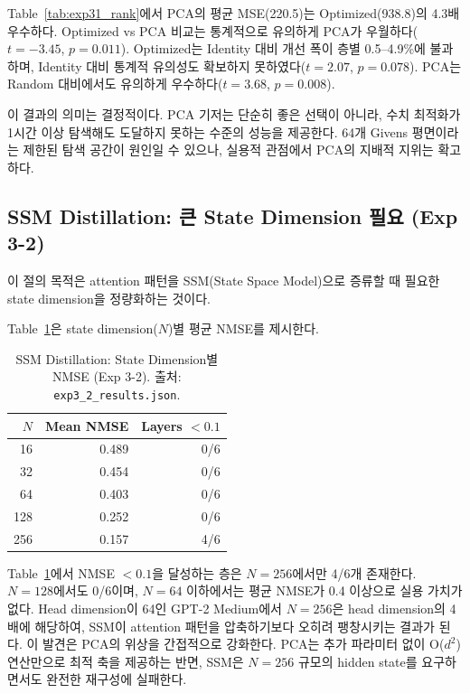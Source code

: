 \documentclass[11pt,a4paper]{article}
\begin{document}
Table~\ref{tab:exp31_rank}에서 PCA의 평균 MSE(220.5)는 Optimized(938.8)의 4.3배 우수하다.
Optimized vs PCA 비교는 통계적으로 유의하게 PCA가 우월하다($t = -3.45$, $p = 0.011$).
Optimized는 Identity 대비 개선 폭이 층별 0.5--4.9\%에 불과하며, Identity 대비 통계적 유의성도 확보하지 못하였다($t = 2.07$, $p = 0.078$).
PCA는 Random 대비에서도 유의하게 우수하다($t = 3.68$, $p = 0.008$).

이 결과의 의미는 결정적이다.
PCA 기저는 단순히 좋은 선택이 아니라, 수치 최적화가 1시간 이상 탐색해도 도달하지 못하는 수준의 성능을 제공한다.
64개 Givens 평면이라는 제한된 탐색 공간이 원인일 수 있으나, 실용적 관점에서 PCA의 지배적 지위는 확고하다.

\subsection{SSM Distillation: 큰 State Dimension 필요 (Exp 3-2)}
\label{sec:exp32}

이 절의 목적은 attention 패턴을 SSM(State Space Model)으로 증류할 때 필요한 state dimension을 정량화하는 것이다.

Table~\ref{tab:exp32_main}은 state dimension($N$)별 평균 NMSE를 제시한다.

\begin{table}[H]
\centering
\caption{SSM Distillation: State Dimension별 NMSE (Exp 3-2). 출처: \texttt{exp3\_2\_results.json}.}
\label{tab:exp32_main}
\begin{tabular}{rrr}
\toprule
\textbf{$N$} & \textbf{Mean NMSE} & \textbf{Layers $< 0.1$} \\
\midrule
16 & 0.489 & 0/6 \\
32 & 0.454 & 0/6 \\
64 & 0.403 & 0/6 \\
128 & 0.252 & 0/6 \\
256 & 0.157 & 4/6 \\
\bottomrule
\end{tabular}
\end{table}

Table~\ref{tab:exp32_main}에서 NMSE $< 0.1$을 달성하는 층은 $N = 256$에서만 4/6개 존재한다.
$N = 128$에서도 0/6이며, $N = 64$ 이하에서는 평균 NMSE가 0.4 이상으로 실용 가치가 없다.
Head dimension이 64인 GPT-2 Medium에서 $N = 256$은 head dimension의 4배에 해당하여, SSM이 attention 패턴을 압축하기보다 오히려 팽창시키는 결과가 된다.
이 발견은 PCA의 위상을 간접적으로 강화한다. PCA는 추가 파라미터 없이 O($d^2$) 연산만으로 최적 축을 제공하는 반면, SSM은 $N = 256$ 규모의 hidden state를 요구하면서도 완전한 재구성에 실패한다.
\end{document}
